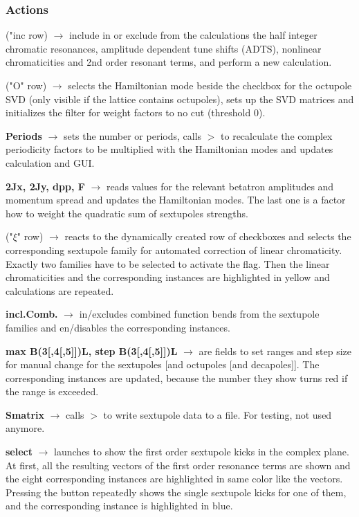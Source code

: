 \documentclass[12pt]{article}
\newcommand\code[1]{{\tt #1}}
\newcommand{\ofld}[1]{\colorbox{black!15}{{\bf #1}}}
\newcommand{\ofldx}[1]{\colorbox{black!15}{(#1)}}
\newcommand\guico[1]{{\color{blue}\code{#1}}}
\newcommand{\unico}[1]{{\color{burntorange}\code{#1}}}
\newcommand{\evcod}[2]{\ofld{#1} $\rightarrow$ \guico{#2}}
\newcommand{\evcodx}[2]{\ofldx{#1} $\rightarrow$ \guico{#2}}
\newcommand{\prcod}[2]{\opauni{#1}$>$\unico{#2}}
\newcommand{\opagui}[1]{\colorbox{blue!20}{{\color{black}\code{#1}}}}
\newcommand{\ogui}[1]{\hyperref[#1]{\opagui{#1}}}
\newcommand{\opaguif}[1]{\colorbox{violet!30}{{\color{black}\code{#1}}}}
\newcommand{\oguif}[1]{\hyperref[#1]{\opaguif{#1}}}
\newcommand{\opauni}[1]{\colorbox{orange!30}{{\color{black}\code{#1}}}}
\newcommand{\act}[1]{\subsubsection*{Actions} #1}
\newcommand{\todo}[1]{{\color{red} #1}}
\begin{document}
\act{
\evcodx{"inc row}{Check(2Q,Qxx,Cr2,Oct)Click} include in or exclude from the calculations the half integer chromatic resonances, amplitude dependent tune shifts (ADTS), nonlinear chromaticities and 2nd order resonant terms, and perform a new calculation.

\evcodx{"O" row}{CheckOctClick} selects the Hamiltonian mode beside the checkbox for the octupole SVD (only visible if the lattice contains octupoles), sets up the SVD matrices and initializes the filter for weight factors to no cut (threshold 0).

\evcod{Periods}{edPer(KeyPress,Exit)} sets the number or periods, calls \prcod{chromlib}{S\_Period} to recalculate the complex periodicity factors to be multiplied with the Hamiltonian modes and updates calculation and GUI.

\evcod{2Jx, 2Jy, dpp, F}{EdScPar(KeyPress,Exit)} reads values for the relevant betatron amplitudes and momentum spread and updates the Hamiltonian modes. The last one is a factor how to weight the quadratic sum of sextupoles strengths.

\evcodx{"$\xi$" row}{CSelectClick} reacts to the dynamically created row of checkboxes and selects the corresponding sextupole family for automated correction of linear chromaticity. Exactly two families have to be selected to activate the \guico{AutoChrom} flag. Then the linear chromaticities and the corresponding \oguif{csexframe} instances are highlighted in yellow and calculations are repeated.

\evcod{incl.Comb.}{ChkCombClick} in/excludes combined function bends from the sextupole families and en/disables the corresponding \oguif{csexframe} instances.

\evcod{max B(3[,4[,5]])L, step B(3[,4[,5]])L}{edSOD(KeyPress,Exit)} are fields to set ranges and step size for manual change for the sextupoles [and octupoles [and decapoles]]. The corresponding \oguif{csexframe} instances are updated, because the number they show turns red if the range is exceeded.

\evcod{Smatrix}{butSmatClick} calls \prcod{chromlib}{S\_TestOut} to write sextupole data to a file. \todo{For testing, not used anymore}.

\evcod{select}{butSelectClick} launches \ogui{ochromsvector} to show the first order sextupole kicks in the complex plane. At first, all the resulting vectors of the first order resonance terms are shown and the eight corresponding  \oguif{chamframe} instances are highlighted in same color like the vectors. Pressing the button repeatedly shows the single sextupole kicks for one of them, and the corresponding \oguif{chamframe} instance is highlighted in blue.

}
\end{document}
